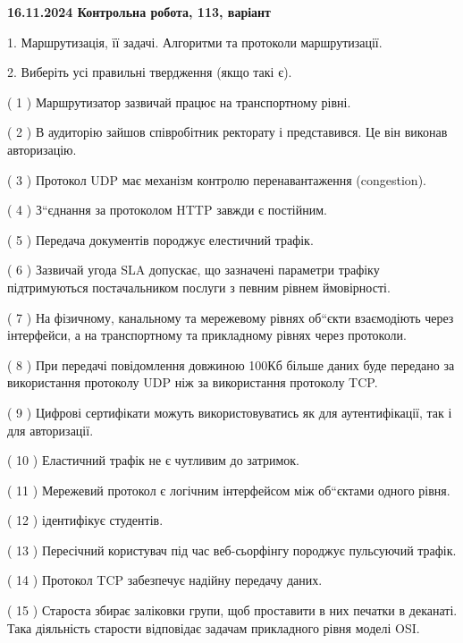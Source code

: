 \documentclass[12pt, ukrainian]{article}
\begin{document}
\vspace{4mm}
\newpage
\begin {large}

\textbf{16.11.2024 Контрольна робота, 113, варіант  }\par


{
1. Маршрутизація, її задачі. Алгоритми та протоколи маршрутизації.



\vspace{5mm}
2. Виберіть усі правильні твердження (якщо такі є).\par
\vspace{2mm}

( 1 ) Маршрутизатор зазвичай працює на транспортному рівні.

( 2 ) В аудиторію зайшов співробітник ректорату і представився. Це він виконав авторизацію.

( 3 ) Протокол UDP має механізм контролю перенавантаження (congestion).

( 4 ) З“єднання за протоколом  HTTP завжди є постійним.

( 5 ) Передача документів породжує елестичний трафік.

( 6 ) Зазвичай угода  SLA допускає, що зазначені параметри трафіку підтримуються постачальником послуги з певним рівнем ймовірності.

( 7 ) На фізичному, канальному та мережевому рівнях об“єкти взаємодіють через інтерфейси, а на транспортному та прикладному рівнях через протоколи.

( 8 ) При передачі повідомлення довжиною 100Кб більше даних буде передано за використання протоколу UDP ніж за використання протоколу TCP.

( 9 ) Цифрові сертифікати можуть використовуватись як для аутентифікації, так і для авторизації.

( 10 ) Еластичний трафік не є чутливим до затримок.

( 11 ) Мережевий протокол є логічним інтерфейсом між об“єктами одного рівня.

( 12 ) ідентифікує студентів.

( 13 ) Пересічний користувач під час веб-сьорфінгу породжує пульсуючий трафік.

( 14 ) Протокол TCP забезпечує надійну передачу даних.

( 15 ) Староста збирає заліковки групи, щоб проставити в них печатки в деканаті. Така діяльність старости відповідає задачам прикладного рівня моделі OSI.
}
\end {large}
\end{document}
